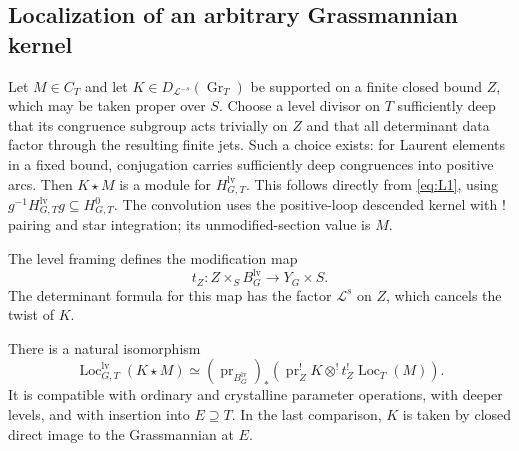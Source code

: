 \subsection{Localization of an arbitrary Grassmannian kernel}

Let $M\in C_T$ and let
$K\in D_{\mathcal L^{-s}}(\operatorname{Gr}_T)$ be supported on a
finite closed bound $Z$, which may be taken proper over $S$.  Choose a
level divisor on $T$ sufficiently deep that its congruence subgroup
acts trivially on $Z$ and that all determinant data factor through
the resulting finite jets.  Such a choice exists: for Laurent elements
in a fixed bound, conjugation carries sufficiently deep congruences
into positive arcs.  Then $K\star M$ is a module for
$H_{G,T}^{\mathrm{lv}}$.  This follows directly from \eqref{eq:L1},
using $g^{-1}H_{G,T}^{\mathrm{lv}}g\subseteq H_{G,T}^0$.
The convolution uses the positive-loop descended kernel with $!$
pairing and star integration; its unmodified-section value is $M$.

The level framing defines the modification map
\[
 t_Z:Z\times_S B_G^{\mathrm{lv}}\longrightarrow Y_G\times S.
\]
The determinant formula for this map has the factor $\mathcal L^s$
on $Z$, which cancels the twist of $K$.

\begin{proposition}\label{loc:kernel}
There is a natural isomorphism
\begin{equation}\label{eq:T6}
 \operatorname{Loc}_{G,T}^{\mathrm{lv}}(K\star M)
 \simeq
 (\operatorname{pr}_{B_G^{\mathrm{lv}}})_*
 \left(\operatorname{pr}_Z^!K\otimes^!
                         t_Z^!\operatorname{Loc}_T(M)\right).
\end{equation}
It is compatible with ordinary and crystalline parameter operations,
with deeper levels, and with insertion into $E\supseteq T$.  In the
last comparison, $K$ is taken by closed direct image to the
Grassmannian at $E$.
\end{proposition}

